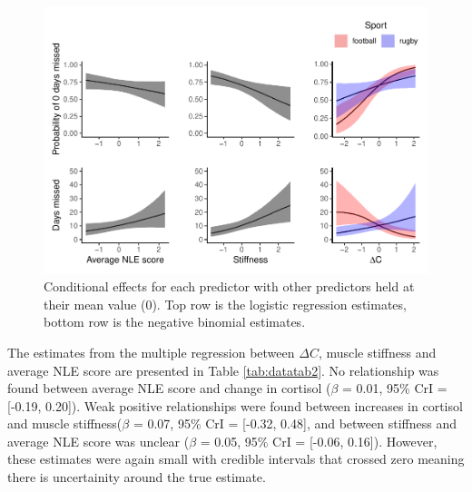 \documentclass[man,floatsintext]{apa6}
\begin{document}
\begin{figure}[H]

{\centering \includegraphics{full_phd_files/figure-latex/hufigs-1} 

}

\caption{Conditional effects for each predictor with other predictors held at their mean value (0). Top row is the logistic regression estimates, bottom row is the negative binomial estimates.}\label{fig:hufigs}
\end{figure}

The estimates from the multiple regression between \(\Delta C\), muscle stiffness and average NLE score are presented in Table \ref{tab:datatab2}.
No relationship was found between average NLE score and change in cortisol (\(\beta\) = 0.01, 95\% CrI = {[}-0.19, 0.20{]}).
Weak positive relationships were found between increases in cortisol and muscle stiffness(\(\beta\) = 0.07, 95\% CrI = {[}-0.32, 0.48{]}, and between stiffness and average NLE score was unclear (\(\beta\) = 0.05, 95\% CrI = {[}-0.06, 0.16{]}).
However, these estimates were again small with credible intervals that crossed zero meaning there is uncertainity around the true estimate.
\end{document}
